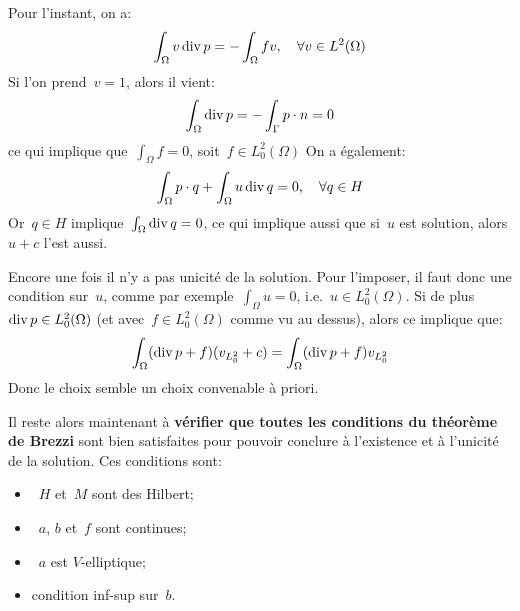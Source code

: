 \medskip
Pour l'instant, on a:
\begin{equation}\displaystyle\int_\Omega v \operatorname{div} p = -\displaystyle\int_\Omega fv,\quad\forall v\in L^2(\Omega)\end{equation}
Si l'on prend~$v=1$, alors il vient:
\begin{equation}\displaystyle\int_\Omega \operatorname{div} p = -\displaystyle\int_\Gamma p\cdot n =0
\end{equation}
ce qui implique que~$\int_\Omega f=0$, soit~$f\in L^2_0(\Omega)$
\medskipvm
On a également:
\begin{equation}\int_\Omega p\cdot q + \displaystyle\int_\Omega u \operatorname{div} q =0,\quad\forall q\in H\end{equation}
Or~$q\in H$ implique~$\int_\Omega \operatorname{div} q =0$, ce qui implique aussi que si~$u$ est solution, alors $u+c$ l'est aussi.

Encore une fois il n'y a pas unicité de la solution. Pour l'imposer, il faut donc une condition sur~$u$, comme par exemple~$\int_\Omega u=0$, i.e.~$u\in L^2_0(\Omega)$. Si de plus~$\operatorname{div} p\in L^2_0(\Omega)$ (et avec~$f\in L^2_0(\Omega)$ comme vu au dessus), alors ce implique que:
\begin{equation}\displaystyle\int_\Omega (\operatorname{div} p + f)(v_{L^2_0}+c) = \displaystyle\int_\Omega (\operatorname{div} p+f) v_{L^2_0}\end{equation}
Donc le choix  semble un choix convenable à priori.

\medskip
Il reste alors maintenant à \textbf{vérifier que toutes les conditions du théorème de Brezzi} sont bien satisfaites pour pouvoir conclure à l'existence et à l'unicité de la solution. Ces conditions sont:
\begin{itemize}
  \item~$H$ et~$M$ sont des Hilbert;
  \item~$a$, $b$ et~$f$ sont continues;
  \item~$a$ est $V$-elliptique;
  \item condition inf-sup sur~$b$.
\end{itemize}

